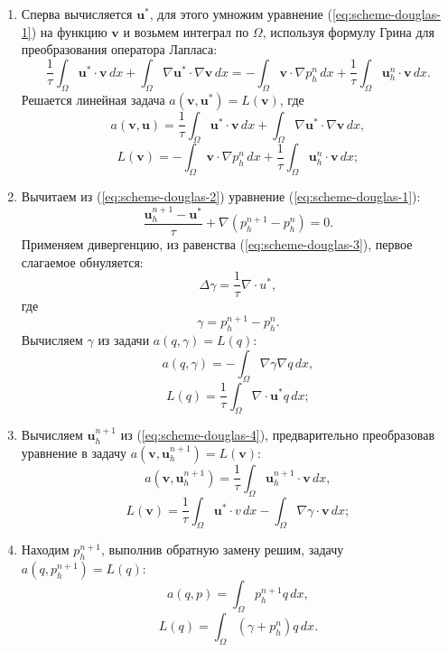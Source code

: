 \documentclass[12pt]{article}
\begin{document}
\begin{enumerate}
\item 
Сперва вычисляется ${\bm u}^*$, для этого умножим уравнение (\ref{eq:scheme-douglas-1}) на функцию $\bm v$ и возьмем интеграл по $\Omega$, используя формулу Грина для преобразования оператора Лапласа:
$$
\frac{1}{\tau}\int_{\Omega} {\bm u}^*\cdot {\bm v} \,dx + \int_{\Omega} \nabla {\bm u}^* \cdot \nabla {\bm v} \,dx = -\int_{\Omega} {\bm v} \cdot \nabla p_h^{n}\, dx + \frac{1}{\tau} \int_{\Omega} {\bm u}_h^{n} \cdot {\bm v} \,dx.
$$
Решается линейная задача $a({\bm v}, {\bm u}^*) = L({\bm v})$, где
$$
a({\bm v}, {\bm u}) = \frac{1}{\tau}\int_{\Omega} {\bm u}^*\cdot {\bm v} \,dx + \int_{\Omega} \nabla {\bm u}^* \cdot \nabla {\bm v} \,dx,
$$
$$
L({\bm v}) = -\int_{\Omega} {\bm v} \cdot \nabla p_h^{n} \,dx + \frac{1}{\tau} \int_{\Omega} {\bm u}_h^{n} \cdot {\bm v} \,dx;
$$
\item 
Вычитаем из (\ref{eq:scheme-douglas-2}) уравнение (\ref{eq:scheme-douglas-1}):
\begin{equation} \label{eq:scheme-douglas-4}
\frac{{\bm u}_h^{n+1}-{\bm u}^*}{\tau} + {\nabla}(p_h^{n+1} - p_h^n )=0.
\end{equation}
Применяем дивергенцию, из равенства ({\ref{eq:scheme-douglas-3}}), первое слагаемое обнуляется:
$$
\Delta \gamma = \frac{1}{\tau} \nabla \cdot u^{*},
$$
где 
$$
\gamma = p_h^{n+1}-p_h^n.
$$
Вычисляем $\gamma$ из задачи $a(q,\gamma)=L(q)$:
$$
a(q, \gamma) = -\int_{\Omega} \nabla \gamma \nabla q \,dx,
$$
$$
L(q) = \frac{1}{\tau} \int_{\Omega} \nabla \cdot {\bm u}^* q \,dx;
$$
\item 
Вычисляем ${\bm u}_h^{n+1}$ из (\ref{eq:scheme-douglas-4}), предварительно преобразовав уравнение в задачу $a({\bm v}, {\bm u}_h^{n+1}) = L({\bm v})$:
$$
a({\bm v}, {\bm u}_h^{n+1}) = \frac{1}{\tau} \int_{\Omega} {\bm u}_h^{n+1} \cdot {\bm v}\,dx,
$$
$$
L({\bm v}) = \frac{1}{\tau} \int_{\Omega} {\bm u}^* \cdot v \,dx - \int_{\Omega} \nabla \gamma \cdot {\bm v} \,dx;
$$
\item 
Находим $p_h^{n+1}$, выполнив обратную замену решим, задачу $a(q,p_h^{n+1})=L(q)$:
$$
a(q, p) = \int_{\Omega} p_h^{n+1} q\,dx,
$$
$$
L(q) = \int_{\Omega} (\gamma + p_h^n) q\,dx.
$$
\end{enumerate}

\end{document}
